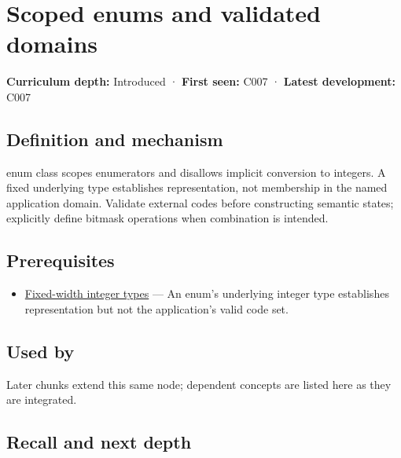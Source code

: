 \hypertarget{appendix-23640fcee147}{}\label{referencestart:appendix-23640fcee147}
\section{Scoped enums and validated domains}\label{appendix-23640fcee147-scoped-enums-and-validated-domains}

\textbf{Curriculum depth:} Introduced · \textbf{First seen:} C007 · \textbf{Latest development:} C007

\begin{allmightroledefinition}

\subsection{Definition and mechanism}\label{appendix-23640fcee147-definition-and-mechanism}

enum class scopes enumerators and disallows implicit conversion to integers. A fixed underlying type establishes representation, not membership in the named application domain. Validate external codes before constructing semantic states; explicitly define bitmask operations when combination is intended.

\end{allmightroledefinition}

\subsection{Prerequisites}\label{appendix-23640fcee147-prerequisites}

\begin{itemize}
\tightlist
\item
  \hyperref[appendix-cc04044b5782]{Fixed-width integer types} --- An enum's underlying integer type establishes representation but not the application's valid code set.
\end{itemize}

\subsection{Used by}\label{appendix-23640fcee147-used-by}

Later chunks extend this same node; dependent concepts are listed here as they are integrated.

\subsection{Recall and next depth}\label{appendix-23640fcee147-recall-and-next-depth}

